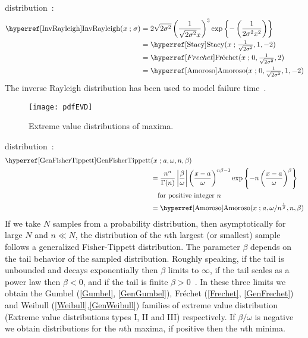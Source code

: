  distribution~\cite{Evans2000}:
\begin{align}
\label{InvRayleigh}
\opr{InvRayleigh}(x \given \sigma) 
&= 2 \sqrt{2 \sigma ^2}    \left(\frac{1}{\sqrt{2 \sigma^2} x}\right)^{3} \exp\left\{-\left(\frac{1}{2 \sigma^2 x^2}  \right)\right\}
\checked
\\
&=  \opr{Stacy}(x\given \tfrac{1}{\sqrt{2 \sigma^2}}, 1, -2)  \notag \checked \\
& = \Frechet(x\given 0, \tfrac{1}{\sqrt{2 \sigma^2}}, 2)\notag \\
&=  \opr{Amoroso}(x\given  0, \tfrac{1}{\sqrt{2 \sigma^2}}, 1, -2)  \checked \notag 
\end{align}
The inverse Rayleigh distribution has been used to model  failure time~\cite{Voda1972}.





\label{SecExtremeOrderStatistic}


\begin{figure}[t]
\begin{center}
\texttt{[image: pdfEVD]}
\end{center}
\caption{Extreme value distributions of maxima.}
\end{figure}



 distribution~\cite{Smirnov1949,Barndorff-Nielsen1963}:
\begin{align}
\label{GenFisherTippett}  
 \opr{GenFisherTippett}&(x\given  a, \omega, n, \beta) 
\notag
\\ \notag
&=
\frac{n^n}{\Gamma(n)} 
\left|\frac{\beta}{\omega}\right|
\left(\frac{x-a}{\omega}\right)^{n \beta -1}
\exp \left\{
-  n \left(\frac{x-a}{\omega}\right)^{\beta}
\right\} \checked
\\
& \quad \text{for positive integer } n
\\ \notag
& = \opr{Amoroso}(x\given a,{\omega}/{n^{\frac{1}{\beta} }},n,\beta) \checked
\end{align}
If we take $N$ samples from a probability distribution, then asymptotically for large $N$ and $n\ll N$, the distribution of the $n$th largest (or smallest) sample follows a generalized Fisher-Tippett distribution. The parameter $\beta$ depends on the tail behavior of the sampled distribution. Roughly speaking, if the tail is unbounded and decays exponentially then $\beta$ limits to $\infty$, if the tail scales as a power law then $\beta<0$,  and if the tail is finite $\beta>0$~\cite{Gumbel1958}. In these three limits we obtain the Gumbel (\ref{Gumbel}, \ref{GenGumbel}), Fr\'{e}chet (\ref{Frechet}, \ref{GenFrechet}) and Weibull (\ref{Weibull},\ref{GenWeibull}) families of extreme value distribution (Extreme value distributions types I, II and III) respectively. If $\beta/\omega$ is negative we obtain distributions for the $n$th maxima, if positive then the $n$th minima.

